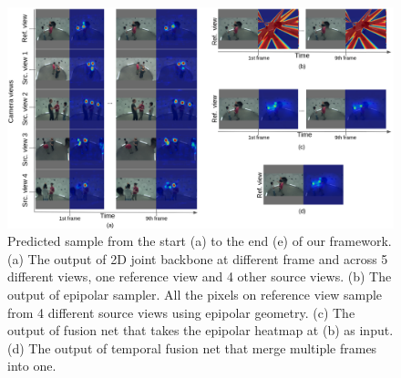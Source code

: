 \begin{figure}
	\centering
	\includegraphics[width=1.0\columnwidth]{figures/ch4/full-framework-heatmap.png}
	\caption{Predicted sample from the start (a) to the end (e) of our framework. (a) The output of 2D joint backbone at different frame and across 5 different views, one reference view and 4 other source views. (b) The output of epipolar sampler. All the pixels on reference view sample from 4 different source views using epipolar geometry. (c) The output of fusion net that takes the epipolar heatmap at (b) as input. (d) The output of temporal fusion net that merge multiple frames into one.}
	\label{fig:full-framework-heatmap}
\end{figure}